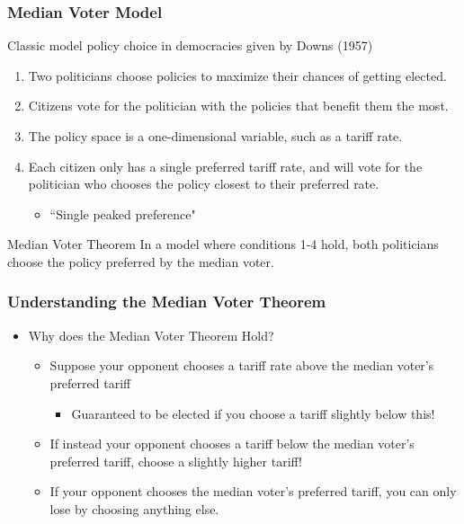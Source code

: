 \documentclass{beamer}
\begin{document}
\begin{frame}
	\frametitle{Median Voter Model}

Classic model policy choice in democracies given by Downs (1957)

		\begin{enumerate}
					\item Two politicians choose policies to maximize their chances of getting elected.
					\item Citizens vote for the politician with the policies that benefit them the most.
					\item The policy space is a one-dimensional variable, such as a tariff rate.
					\item Each citizen only has a single preferred tariff rate, and will vote for the politician who chooses the policy closest to their preferred rate.
						\begin{itemize}
							\item ``Single peaked preference"
						\end{itemize}
		\end{enumerate}

	\begin{block}{Median Voter Theorem}
		In a model where conditions 1-4 hold, both politicians choose the policy preferred by the median voter.
	\end{block}

\end{frame}

\begin{frame}
	\frametitle{Understanding the Median Voter Theorem}
\begin{itemize}
	\item Why does the Median Voter Theorem Hold?
		\begin{itemize}
			\item Suppose your opponent chooses a tariff rate above the median voter's preferred tariff
				\begin{itemize}
					\item Guaranteed to be elected if you choose a tariff slightly below this!
				\end{itemize} 
			\item If instead your opponent chooses a tariff below the median voter's preferred tariff, choose a slightly higher tariff!  
			\item If your opponent chooses the median voter's preferred tariff, you can only lose by choosing anything else.
		\end{itemize}

\end{itemize}
\end{frame}
\end{document}
